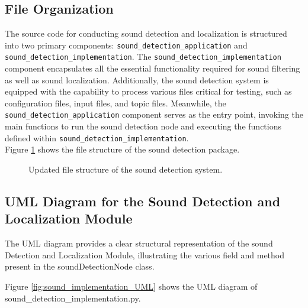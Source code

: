 \documentclass{CSSRforAfrica}
\begin{document}
\subsection*{File Organization}
The source code for conducting sound detection and localization is structured into two primary components: \texttt{sound\_detection\_application} and  \texttt{sound\_detection\_implementation}. The \texttt{sound\_detection\_implementation} component encapsulates all the essential functionality required for sound filtering as well as sound localization. Additionally, the sound detection system is equipped with the capability to process various files critical for testing, such as configuration files, input files, and topic files. Meanwhile, the \texttt{sound\_detection\_application} component serves as the entry point, invoking the main functions to run the sound detection node and executing the functions defined within \texttt{sound\_detection\_implementation}.\\

Figure \ref{fig:sound_detection_directory} shows the file structure of the sound detection package.

\begin{figure}[h]	
	\renewcommand*\DTstyle{\ttfamily}
	\caption{Updated file structure of the sound detection system.}
	\label{fig:sound_detection_directory}
\end{figure}

\subsection*{UML Diagram for the Sound Detection and Localization Module}
The UML diagram provides a clear structural representation of the sound Detection and Localization Module, illustrating the various field and method present in the soundDetectionNode class.

\newpage

Figure \ref{fig:sound_implementation_UML} shows the UML diagram of sound\_detection\_implementation.py.
\end{document}
